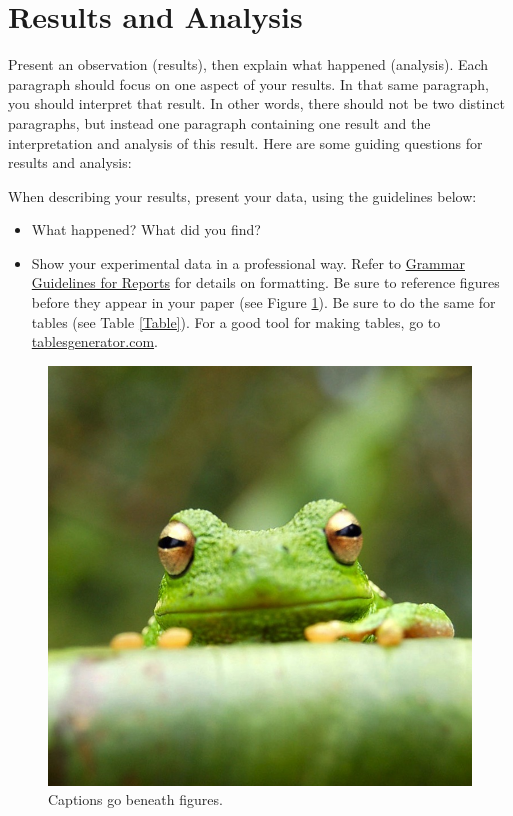 \documentclass[a4paper]{article}
\begin{document}
\section* {Results and Analysis}
Present an observation (results), then explain what happened (analysis).  Each paragraph should focus on one aspect of your results. In that same paragraph, you should interpret that result.
In other words, there should not be two distinct paragraphs, but instead one paragraph containing one result and the interpretation and analysis of this result. Here are some guiding questions for results and analysis:

When describing your results, present your data, using the guidelines below:
\begin{itemize}
\item What happened? What did you find?
\item Show your experimental data in a professional way. Refer to \href{https://confluence.cornell.edu/display/AGUACLARA/Grammar+Guidelines+for+Reports}{Grammar Guidelines for Reports} for details on formatting. Be sure to reference figures before they appear in your paper (see Figure \ref{Frog}). Be sure to do the same for tables (see Table \ref{Table}). For a good tool for making tables, go to \href{www.tablesgenerator.com}{tablesgenerator.com}.
\end{itemize}

\begin{figure}[H]
\centering
\includegraphics[scale=0.1]{frog}
\caption{Captions go beneath figures.}
\label{Frog}
\end{figure}
\end{document}
